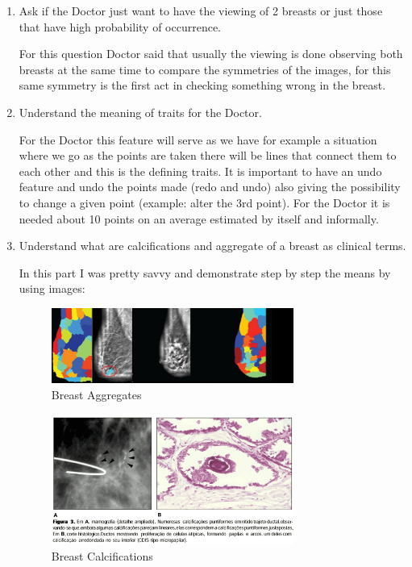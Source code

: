 \begin{enumerate}
  
  \item Ask if the Doctor just want to have the viewing of 2 breasts or just those that have high probability of occurrence.
  
  For this question Doctor said that usually the viewing is done observing both breasts at the same time to compare the symmetries of the images, for this same symmetry is the first act in checking something wrong in the breast.
  
  \item Understand the meaning of traits for the Doctor.
  
  For the Doctor this feature will serve as we have for example a situation where we go as the points are taken there will be lines that connect them to each other and this is the defining traits. It is important to have an undo feature and undo the points made (redo and undo) also giving the possibility to change a given point (example: alter the 3rd point). For the Doctor it is needed about 10 points on an average estimated by itself and informally.
  
  \item Understand what are calcifications and aggregate of a breast as clinical terms.
  
  In this part I was pretty savvy and demonstrate step by step the means by using images:
  
\begin{figure}[!hbt]
\centering
\includegraphics[width=0.75\textwidth]{breast_aggregates.png}
\caption{\label{fig:frog}Breast Aggregates}
\end{figure}

\begin{figure}[!hbt]
\centering
\includegraphics[width=0.75\textwidth]{breast_calcifications.png}
\caption{\label{fig:frog}Breast Calcifications}
\end{figure}
  

\end{enumerate}
